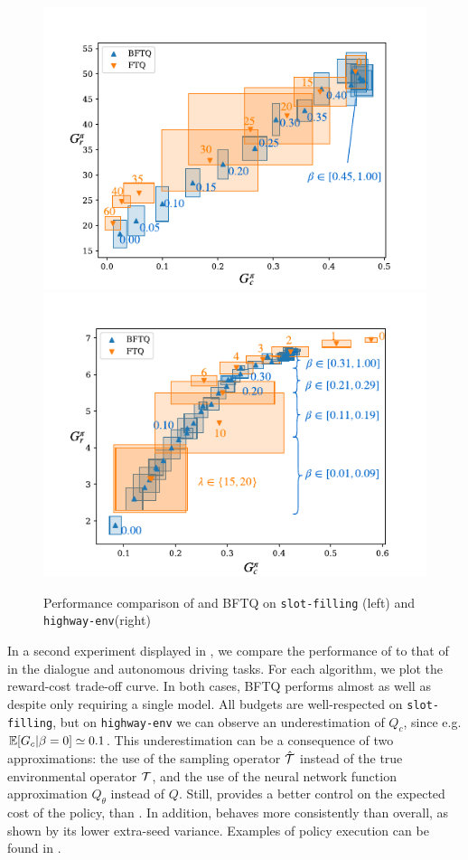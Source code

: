 \documentclass{article}
\begin{document}
\begin{figure}[tp]
    \begin{center}
    \includegraphics[width=0.49\linewidth]{source/img/slot-filling}
    \includegraphics[width=0.49\linewidth]{source/img/highway}
    \caption{Performance comparison of \FTQl and BFTQ on \texttt{slot-filling} (left) and \texttt{highway-env}(right) }
    \label{fig:results}
    \end{center}
\end{figure}

In a second experiment displayed in , we compare the performance of \FTQl to that of \BFTQ in the dialogue and autonomous driving tasks. For each algorithm, we plot the reward-cost trade-off curve. In both cases, BFTQ performs almost as well as \FTQl despite only requiring a single model. All budgets are well-respected on \texttt{slot-filling}, but on \texttt{highway-env} we can observe an underestimation of $Q_c$, since e.g. $\operatorname*{\mathbb{E}}[G_c|\beta=0] \simeq 0.1 $. This underestimation can be a consequence of two approximations: the use of the sampling operator $\hat{\mathcal{T}}$ instead of the true environmental operator $\mathcal{T}$, and the use of the neural network function approximation $Q_\theta$ instead of $Q$. 
Still, \BFTQ provides a better control on the expected cost of the policy, than \FTQl. In addition, \BFTQ behaves more consistently than \FTQl overall, as shown by its lower extra-seed variance. Examples of policy execution can be found in .
\end{document}
